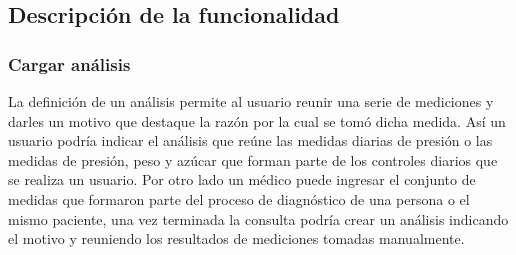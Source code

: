 \documentclass[a4paper,12pt]{article}
\begin{document}
{\scriptsize
	\begin{center} %
		\centering
	\end{center}
}

\subsection{Descripción de la funcionalidad} %
\subsubsection{Cargar análisis}

 La definición de un análisis permite al usuario reunir una serie de mediciones y darles un motivo que destaque la razón por la cual se tomó dicha medida. Así un usuario podría indicar el análisis que reúne las medidas diarias de presión o las medidas de presión, peso y azúcar que forman parte de los controles diarios que se realiza un usuario. Por otro lado un médico puede ingresar el conjunto de medidas que formaron parte del proceso de diagnóstico de una persona o el mismo paciente, una vez terminada la consulta podría crear un análisis indicando el motivo y reuniendo los resultados de mediciones tomadas manualmente.
\end{document}
